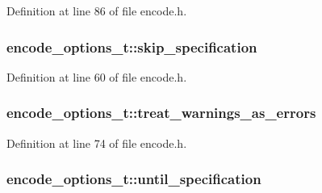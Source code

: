 Definition at line 86 of file encode.\+h.

\subsubsection[{\texorpdfstring{skip\+\_\+specification}{skip_specification}}]{ encode\+\_\+options\+\_\+t\+::skip\+\_\+specification}\hypertarget{structencode__options__t_a91f54e0c0206f172d4ff44746cf79c4b}{}\label{structencode__options__t_a91f54e0c0206f172d4ff44746cf79c4b}


Definition at line 60 of file encode.\+h.

\subsubsection[{\texorpdfstring{treat\+\_\+warnings\+\_\+as\+\_\+errors}{treat_warnings_as_errors}}]{ encode\+\_\+options\+\_\+t\+::treat\+\_\+warnings\+\_\+as\+\_\+errors}\hypertarget{structencode__options__t_acdc055ecba6920a4af136fe40e6a3911}{}\label{structencode__options__t_acdc055ecba6920a4af136fe40e6a3911}


Definition at line 74 of file encode.\+h.

\subsubsection[{\texorpdfstring{until\+\_\+specification}{until_specification}}]{ encode\+\_\+options\+\_\+t\+::until\+\_\+specification}\hypertarget{structencode__options__t_ab328bbf490ed9ec92155645e31306e76}{}\label{structencode__options__t_ab328bbf490ed9ec92155645e31306e76}


